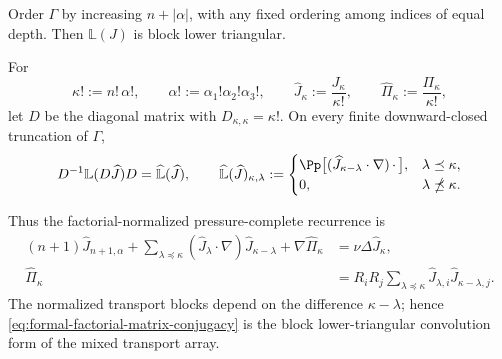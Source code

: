 \begin{proposition}
Order \(\Gamma\) by increasing \(n+|\alpha|\), with any fixed ordering among
indices of equal depth.  Then \(\mathbb L(J)\) is block lower triangular.
\begin{samepage}
For
\[
 \kappa!:=n!\,\alpha!,
 \qquad
 \alpha!:=\alpha_1!\alpha_2!\alpha_3!,
 \qquad
 \widehat J_\kappa:=\frac{J_\kappa}{\kappa!},
 \qquad
 \widehat\Pi_\kappa:=\frac{\Pi_\kappa}{\kappa!},
\]
let \(D\) be the diagonal matrix with \(D_{\kappa,\kappa}=\kappa!\).  On
every finite downward-closed truncation of \(\Gamma\),
\begin{equation}
 D^{-1}\mathbb L(D\widehat J)D
 =\widehat{\mathbb L}(\widehat J),
 \qquad
 \widehat{\mathbb L}(\widehat J)_{\kappa,\lambda}
 :=
 \begin{cases}
 \Pp\bigl[(\widehat J_{\kappa-\lambda}\cdot\nabla)
            \,\mathord\cdot\,\bigr],
 &\lambda\preceq\kappa,\\
 0,&\lambda\npreceq\kappa.
 \end{cases}
 \label{eq:formal-factorial-matrix-conjugacy}
\end{equation}
\end{samepage}
Thus the factorial-normalized pressure-complete recurrence is
\begin{align}
 (n+1)\widehat J_{n+1,\alpha}
 +\sum_{\lambda\preceq\kappa}
   (\widehat J_\lambda\cdot\nabla)
   \widehat J_{\kappa-\lambda}
 +\nabla\widehat\Pi_\kappa
 &=\nu\Delta\widehat J_\kappa,
 \label{eq:formal-factorial-velocity-convolution}\\
 \widehat\Pi_\kappa
 &=R_iR_j\sum_{\lambda\preceq\kappa}
   \widehat J_{\lambda,i}\widehat J_{\kappa-\lambda,j}.
 \label{eq:formal-factorial-pressure-convolution}
\end{align}
The normalized transport blocks depend on the difference
\(\kappa-\lambda\); hence \eqref{eq:formal-factorial-matrix-conjugacy} is the
block lower-triangular convolution form of the mixed transport array.
\end{proposition}

